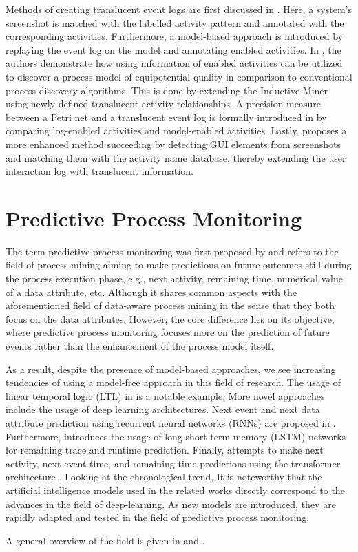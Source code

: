 Methods of creating translucent event logs are first discussed in \cite{creating-translucent-event-logs}. Here, a system's screenshot is matched with the labelled activity pattern and annotated with the corresponding activities. Furthermore, a model-based approach is introduced by replaying the event log on the model and annotating enabled activities. In \cite{translucent-activity-relationships}, the authors demonstrate how using information of enabled activities can be utilized to discover a process model of equipotential quality in comparison to conventional process discovery algorithms. This is done by extending the Inductive Miner \cite{inductive-miner} using newly defined translucent activity relationships. A precision measure between a Petri net and a translucent event log is formally introduced in \cite{translucent-precision} by comparing log-enabled activities and model-enabled activities. Lastly, \cite{activity-gen} proposes a more enhanced method succeeding \cite{creating-translucent-event-logs} by detecting GUI elements from screenshots and matching them with the activity name database, thereby extending the user interaction log with translucent information.

\section{Predictive Process Monitoring}

The term predictive process monitoring was first proposed by \cite{predictive-monitoring-of-business-processes} and refers to the field of process mining aiming to make predictions on future outcomes still during the process execution phase, e.g., next activity, remaining time, numerical value of a data attribute, etc. Although it shares common aspects with the aforementioned field of data-aware process mining in the sense that they both focus on the data attributes. However, the core difference lies on its objective, where predictive process monitoring focuses more on the prediction of future events rather than the enhancement of the process model itself.

As a result, despite the presence of model-based approaches, we see increasing tendencies of using a model-free approach in this field of research. The usage of linear temporal logic (LTL) \cite{ltl} in \cite{predictive-monitoring-of-business-processes} is a notable example. More novel approaches include the usage of deep learning architectures. Next event and next data attribute prediction using recurrent neural networks (RNNs) \cite{rnn} are proposed in \cite{predictive-process-monitoring-rnn}. Furthermore, \cite{predictive-process-monitoring-lstm} introduces the usage of long short-term memory (LSTM) networks \cite{lstm} for remaining trace and runtime prediction. Finally, \cite{predictive-process-monitoring-transformer} attempts to make next activity, next event time, and remaining time predictions using the transformer architecture \cite{attention-is-all-you-need}. Looking at the chronological trend, It is noteworthy that the artificial intelligence models used in the related works directly correspond to the advances in the field of deep-learning. As new models are introduced, they are rapidly adapted and tested in the field of predictive process monitoring.

A general overview of the field is given in \cite{predictive-process-monitoring} and \cite{predictive-monitoring-of-business-processes}.

